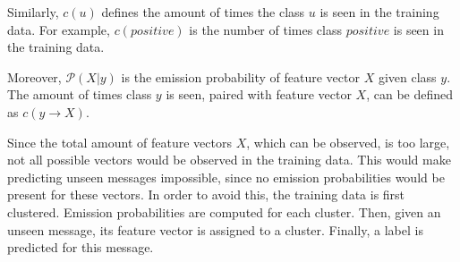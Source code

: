 Similarly, $c(u)$ defines the amount of times the class $u$ is seen in the training data. For example, $c(positive)$ is the number of times class $positive$ is seen in the training data.

Moreover, $\mathcal{P}(X | y)$ is the emission probability of feature vector $X$ given class $y$. The amount of times class $y$ is seen, paired with feature vector $X$, can be defined as $c(y \rightarrow X)$.

\begin{comment}
$c(u, v)$ defined as the number of times the sequence of class $u$ followed by class $v$ is seen in training data.
For example, $c(positive, negative)$ is the number of times sequence of class $positive$ followed by class $negative$ is observed in the training data.
Similarly, $c(u)$ defined as the number of times the class $u$ is seen in the training data.
For example, $c(positive)$ is the number of times class $positive$ is seen in the training data.
Moreover, $\mathcal{P}(X | y)$ is the emission probability of feature vector $X$ given class $y$.
$c(y \rightarrow X)$ defined as the number of times class $y$ is seen paired with feature vector X in the training data.
\end{comment}

\noindent Since the total amount of feature vectors $X$, which can be observed, is too large, not all possible vectors would be observed in the training data. This would make predicting unseen messages impossible, since no emission probabilities would be present for these vectors. In order to avoid this, the training data is first clustered. Emission probabilities are computed for each cluster. Then, given an unseen message, its feature vector is assigned to a cluster. Finally, a label is predicted for this message. 
